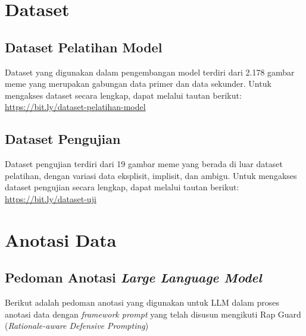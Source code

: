 \section{Dataset}
\subsection{Dataset Pelatihan Model}
Dataset yang digunakan dalam pengembangan model terdiri dari 2.178 gambar meme yang merupakan gabungan data primer dan data sekunder. Untuk mengakses dataset secara lengkap, dapat melalui tautan berikut: \href{https://bit.ly/dataset-pelatihan-model}{https://bit.ly/dataset-pelatihan-model}

\subsection{Dataset Pengujian}
Dataset pengujian terdiri dari 19 gambar meme yang berada di luar dataset pelatihan, dengan variasi data eksplisit, implisit, dan ambigu. Untuk mengakses dataset pengujian secara lengkap, dapat melalui tautan berikut: \href{https://bit.ly/dataset-uji}{https://bit.ly/dataset-uji}

\section{Anotasi Data}
\subsection{Pedoman Anotasi \textit{Large Language Model}}
Berikut adalah pedoman anotasi yang digunakan untuk LLM dalam proses anotasi data dengan \textit{framework prompt} yang telah disusun mengikuti Rap Guard (\textit{Rationale-aware Defensive Prompting})
\vspace{0.5cm}


